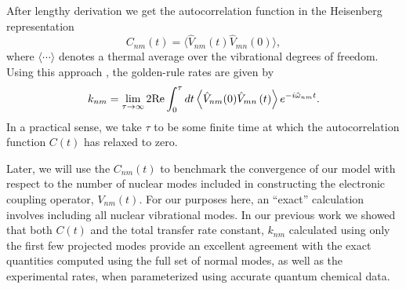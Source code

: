 After lengthy derivation we get the autocorrelation function in the Heisenberg representation
$$
C_{nm}(t) =\langle \hat V_{nm}(t) \hat V_{mn}(0)\rangle,\label{cor-fun}
$$
where $\langle \cdots \rangle$ denotes a thermal average over the
vibrational degrees of freedom.
Using this approach , the golden-rule rates are given by
\begin{eqnarray}
k_{nm}=\lim_{\tau \to \infty}2{\rm Re}\int_{0}^{\tau}dt\left\langle \hat V_{nm}(0)\hat V_{mn}\left(t\right)\right\rangle e^{-i\tilde\omega_{nm}t}.
\label{gr-expression}
\end{eqnarray}
In a practical sense, we take $\tau$ to be some finite time at which the
autocorrelation function $C(t)$
has relaxed to zero.

Later, we will use the $C_{nm}(t) $ to benchmark the convergence of our model with respect to
the number of nuclear modes included in constructing the electronic coupling operator, $V_{nm}(t)$.
For our purposes here,  an ``exact''  calculation involves including all nuclear vibrational modes.
In our previous work we showed that both $C(t)$
and the total transfer rate constant, $k_{nm}$ calculated using only the first few projected modes provide an
excellent agreement with the exact quantities computed using  the full set of
normal modes, as well as the experimental rates,
when parameterized using accurate quantum chemical data.\cite{yang2014intramolecular}





